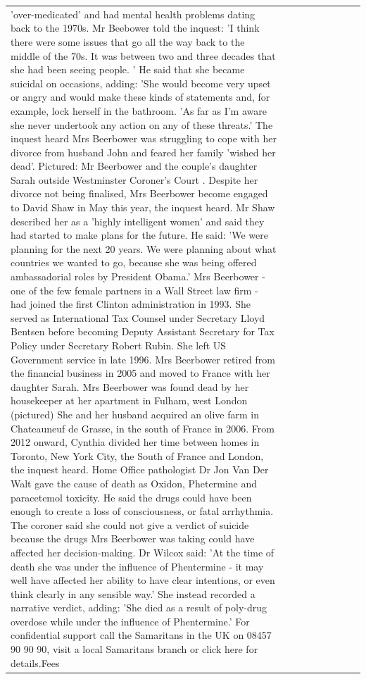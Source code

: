 \begin{table}[H]
\begin{tabular}{lllrlllll}
'over-medicated' and had mental health problems dating back to the 1970s. Mr Beebower told the inquest: 'I think there were some issues that go all the way back to the middle of the 70s. It was between two and three decades that she had been seeing people. ' He said that she became suicidal on occasions, adding: 'She would become very upset or angry and would make these kinds of statements and, for example, lock herself in the bathroom. 'As far as I'm aware she never undertook any action on any of these threats.' The inquest heard Mrs Beerbower was struggling to cope with her divorce from husband John and feared her family 'wished her dead'. Pictured: Mr Beerbower and the couple's daughter Sarah outside Westminster Coroner's Court . Despite her divorce not being finalised, Mrs Beerbower become engaged to David Shaw in May this year, the inquest heard. Mr Shaw described her as a 'highly intelligent women' and said they had started to make plans for the future. He said: 'We were planning for the next 20 years. We were planning about what countries we wanted to go, because she was being offered ambassadorial roles by President Obama.' Mrs Beerbower - one of the few female partners in a Wall Street law firm - had joined the first Clinton administration in 1993. She served as International Tax Counsel under Secretary Lloyd Bentsen before becoming Deputy Assistant Secretary for Tax Policy under Secretary Robert Rubin. She left US Government service in late 1996. Mrs Beerbower retired from the financial business in 2005 and moved to France with her daughter Sarah. Mrs Beerbower was found dead by her housekeeper at her apartment in Fulham, west London (pictured) She and her husband acquired an olive farm in Chateauneuf de Grasse, in the south of France in 2006. From 2012 onward, Cynthia divided her time between homes in Toronto, New York City, the South of France and London, the inquest heard. Home Office pathologist Dr Jon Van Der Walt gave the cause of death as Oxidon, Phetermine and paracetemol toxicity. He said the drugs could have been enough to create a loss of consciousness, or fatal arrhythmia. The coroner said she could not give a verdict of suicide because the drugs Mrs Beerbower was taking could have affected her decision-making. Dr Wilcox said: 'At the time of death she was under the influence of Phentermine - it may well have affected her ability to have clear intentions, or even think clearly in any sensible way.' She instead recorded a narrative verdict, adding: 'She died as a result of poly-drug overdose while under the influence of Phentermine.' For confidential support call the Samaritans in the UK on 08457 90 90 90, visit a local Samaritans branch or click here for details.Fees \\

\end{tabular}
\end{table}
